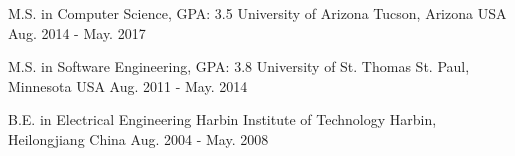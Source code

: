 

\begin{cventries}

  \eduentry
    {M.S. in Computer Science, GPA: 3.5} %
    {University of Arizona} %
    {Tucson, Arizona USA} %
    {Aug. 2014 - May. 2017} %

  \eduentry
    {M.S. in Software Engineering, GPA: 3.8} %
    {University of St. Thomas} %
    {St. Paul, Minnesota USA} %
    {Aug. 2011 - May. 2014} %

  \eduentry
    {B.E. in Electrical Engineering} %
    {Harbin Institute of Technology} %
    {Harbin, Heilongjiang China} %
    {Aug. 2004 - May. 2008} %

\end{cventries}
